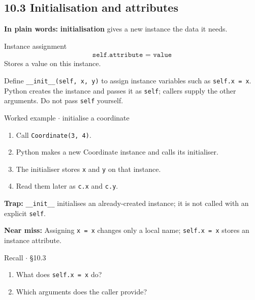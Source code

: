 \documentclass[11pt]{article}
\begin{document}
\begin{keepsection}
\section{10.3 Initialisation and attributes}

\begin{plainbox}\textbf{In plain words:} \textbf{initialisation} gives a new instance the data it needs.\end{plainbox}

\begin{equationcard}{Instance assignment}
\[ \begin{gathered} \texttt{self.attribute = value} \end{gathered} \]
{\small Stores a value on this instance.}
\end{equationcard}

Define \texttt{\_\_init\_\_(self, x, y)} to assign instance variables such as \texttt{self.x = x}. Python creates the instance and passes it as \texttt{self}; callers supply the other arguments. Do not pass \texttt{self} yourself.

\begin{workedbox}{Worked example \ensuremath{\cdot} initialise a coordinate}
\begin{enumerate}
\item Call \texttt{Coordinate(3, 4)}.
\item Python makes a new Coordinate instance and calls its initialiser.
\item The initialiser stores \texttt{x} and \texttt{y} on that instance.
\item Read them later as \texttt{c.x} and \texttt{c.y}.
\end{enumerate}
\end{workedbox}

\begin{notebox}\textbf{Trap:} \texttt{\_\_init\_\_} initialises an already-created instance; it is not called with an explicit \texttt{self}.\end{notebox}

\begin{notebox}\textbf{Near miss:} Assigning \texttt{x = x} changes only a local name; \texttt{self.x = x} stores an instance attribute.\end{notebox}

\begin{recallbox}{Recall \ensuremath{\cdot} §10.3}
\begin{enumerate}
\item What does \texttt{self.x = x} do?
\item Which arguments does the caller provide?
\end{enumerate}

\end{recallbox}
\end{keepsection}
\end{document}
